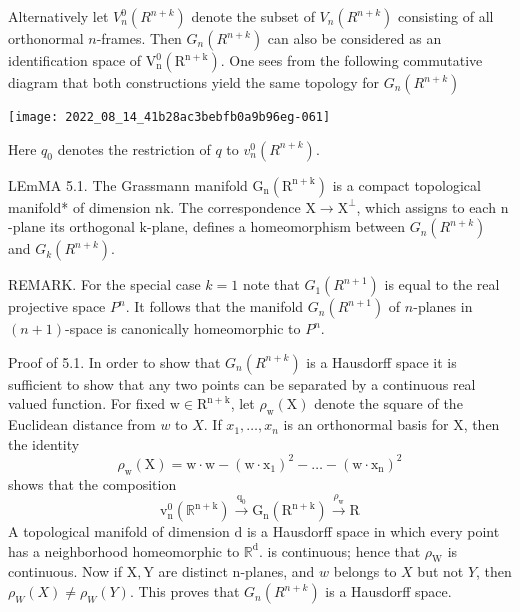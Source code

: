 \documentclass[10pt]{article}
\begin{document}
Alternatively let $V_{n}^{0}\left(R^{n+k}\right)$ denote the subset of $V_{n}\left(R^{n+k}\right)$ consisting of all orthonormal $n$-frames. Then $G_{n}\left(R^{n+k}\right)$ can also be considered as an identification space of $\mathrm{V}_{\mathrm{n}}^{0}\left(\mathrm{R}^{\mathrm{n}+\mathrm{k}}\right)$. One sees from the following commutative diagram that both constructions yield the same topology for $G_{n}\left(R^{n+k}\right)$

\texttt{[image: 2022\_08\_14\_41b28ac3bebfb0a9b96eg-061]}

Here $q_{0}$ denotes the restriction of $q$ to $v_{n}^{0}\left(R^{n+k}\right)$.

LEmMA 5.1. The Grassmann manifold $\mathrm{G}_{\mathrm{n}}\left(\mathrm{R}^{\mathrm{n}+\mathrm{k}}\right)$ is a compact topological manifold* of dimension $\mathrm{nk}$. The correspondence $\mathrm{X} \rightarrow \mathrm{X}^{\perp}$, which assigns to each $\mathrm{n}$-plane its orthogonal $\mathrm{k}$-plane, defines a homeomorphism between $G_{n}\left(R^{n+k}\right)$ and $G_{k}\left(R^{n+k}\right)$.

REMARK. For the special case $k=1$ note that $G_{1}\left(R^{n+1}\right)$ is equal to the real projective space $P^{n}$. It follows that the manifold $G_{n}\left(R^{n+1}\right)$ of $n$-planes in $(n+1)$-space is canonically homeomorphic to $P^{n}$.

Proof of 5.1. In order to show that $G_{n}\left(R^{n+k}\right)$ is a Hausdorff space it is sufficient to show that any two points can be separated by a continuous real valued function. For fixed $\mathrm{w} \in \mathrm{R}^{\mathrm{n}+\mathrm{k}}$, let $\rho_{\mathrm{w}}(\mathrm{X})$ denote the square of the Euclidean distance from $w$ to $X$. If $x_{1}, \ldots, x_{n}$ is an orthonormal basis for $\mathrm{X}$, then the identity
$$
\rho_{\mathrm{w}}(\mathrm{X})=\mathrm{w} \cdot \mathrm{w}-\left(\mathrm{w} \cdot \mathrm{x}_{1}\right)^{2}-\ldots-\left(\mathrm{w} \cdot \mathrm{x}_{\mathrm{n}}\right)^{2}
$$
shows that the composition
$$
\mathrm{v}_{\mathrm{n}}^{0}\left(\mathbb{R}^{\mathrm{n}+\mathrm{k}}\right) \stackrel{\mathrm{q}_{0}}{\longrightarrow} \mathrm{G}_{\mathrm{n}}\left(\mathrm{R}^{\mathrm{n}+\mathrm{k}}\right) \stackrel{\rho_{\mathrm{w}}}{\longrightarrow} \mathrm{R}
$$
A topological manifold of dimension $\mathrm{d}$ is a Hausdorff space in which every point has a neighborhood homeomorphic to $\mathbb{R}^{\mathrm{d}}$. is continuous; hence that $\rho_{\mathrm{W}}$ is continuous. Now if $\mathrm{X}, \mathrm{Y}$ are distinct n-planes, and $w$ belongs to $X$ but not $Y$, then $\rho_{W}(X) \neq \rho_{W}(Y)$. This proves that $G_{n}\left(R^{n+k}\right)$ is a Hausdorff space.
\end{document}
